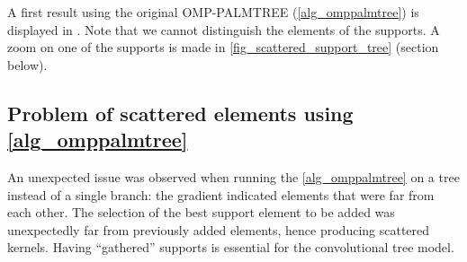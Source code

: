 \noindent
A first result using the original OMP-PALMTREE (\cref{alg_omppalmtree}) is displayed in . Note that we cannot distinguish the elements of the supports. A zoom on one of the supports is made in \cref{fig_scattered_support_tree} (section below).

\subsection{Problem of scattered elements using \cref{alg_omppalmtree}}
 
An unexpected issue was observed when running the \cref{alg_omppalmtree} on a tree instead of a single branch: the gradient indicated elements that were far from each other. The selection of the best support element to be added was unexpectedly far from previously added elements, hence producing scattered kernels. Having “gathered” supports is essential for the convolutional tree model.  

